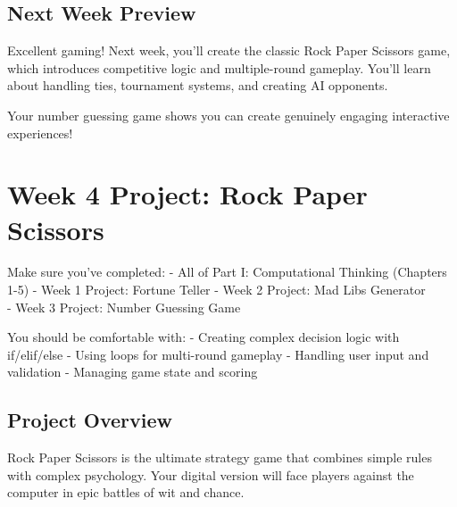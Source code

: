 \documentclass[
  letterpaper,
  DIV=11,
  numbers=noendperiod,
  oneside]{scrreprt}
\begin{document}
\section{Next Week Preview}\label{next-week-preview-2}

Excellent gaming! Next week, you'll create the classic Rock Paper
Scissors game, which introduces competitive logic and multiple-round
gameplay. You'll learn about handling ties, tournament systems, and
creating AI opponents.

Your number guessing game shows you can create genuinely engaging
interactive experiences! 🎯

\chapter{Week 4 Project: Rock Paper
Scissors}\label{sec-project-rock-paper-scissors}

\begin{tcolorbox}[enhanced jigsaw, opacityback=0, colback=white, colframe=quarto-callout-important-color-frame, breakable, titlerule=0mm, coltitle=black, rightrule=.15mm, colbacktitle=quarto-callout-important-color!10!white, left=2mm, bottomtitle=1mm, bottomrule=.15mm, title=\textcolor{quarto-callout-important-color}{\faExclamation}\hspace{0.5em}{Before You Start}, opacitybacktitle=0.6, toptitle=1mm, leftrule=.75mm, arc=.35mm, toprule=.15mm]

Make sure you've completed: - All of Part I: Computational Thinking
(Chapters 1-5) - Week 1 Project: Fortune Teller - Week 2 Project: Mad
Libs Generator\\
- Week 3 Project: Number Guessing Game

You should be comfortable with: - Creating complex decision logic with
if/elif/else - Using loops for multi-round gameplay - Handling user
input and validation - Managing game state and scoring

\end{tcolorbox}

\section{Project Overview}\label{project-overview-3}

Rock Paper Scissors is the ultimate strategy game that combines simple
rules with complex psychology. Your digital version will face players
against the computer in epic battles of wit and chance.
\end{document}
